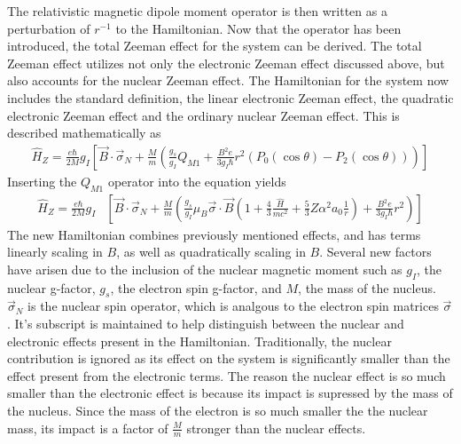            \noindent The relativistic magnetic dipole moment operator is then written as a perturbation of $r^{-1}$ to the Hamiltonian. Now that the operator has been introduced, the total Zeeman effect for the system can be derived. The total Zeeman effect utilizes not only the electronic Zeeman effect discussed above, but also accounts for the nuclear Zeeman effect. The Hamiltonian for the system now includes the standard definition, the linear electronic Zeeman effect, the quadratic electronic Zeeman effect and the ordinary nuclear Zeeman effect. This is described mathematically as 
            \begin{align}
                \hat{H}_Z = \frac{e\hbar}{2M} g_I  \left[ \vec{B} \cdot \vec{\sigma}_N + \frac{M}{m} \left(\frac{g_s}{g_I} Q_{M1} + \frac{B^2 e}{3g_I \hbar} r^2 \left( P_0(\cos \theta) - P_2(\cos\theta) \right) \right) \right]
            \end{align}
            \noindent Inserting the $Q_{M1}$ operator into the equation yields 
            \small         
            \begin{align}
                \hat{H}_Z = \frac{e\hbar}{2M} g_I  &\left[ \vec{B} \cdot \vec{\sigma}_N + \frac{M}{m} \left(\frac{g_s}{g_I} \mu_B \vec{\sigma} \cdot \vec{B} \left(1 + \frac{4}{3}\frac{\hat{H}}{mc^2} + \frac{5}{3} Z \alpha^2 a_0 \frac{1}{r} \right) + \frac{B^2 e}{3g_I \hbar} r^2 \right) \right]
            \end{align}
            \normalsize
            \noindent The new Hamiltonian combines previously mentioned effects, and has terms linearly scaling in $B$, as well as quadratically scaling in $B$. Several new factors have arisen due to the inclusion of the nuclear magnetic moment such as $g_I$, the nuclear g-factor, $g_s$, the electron spin g-factor, and $M$, the mass of the nucleus. $\vec{\sigma}_N$ is the nuclear spin operator, which is analgous to the electron spin matrices $\vec{\sigma}$. It's subscript is maintained to help distinguish between the nuclear and electronic effects present in the Hamiltonian. Traditionally, the nuclear contribution is ignored as its effect on the system is significantly smaller than the effect present from the electronic terms. The reason the nuclear effect is so much smaller than the electronic effect is because its impact is supressed by the mass of the nucleus. Since the mass of the electron is so much smaller the the nuclear mass, its impact is a factor of $\frac{M}{m}$ stronger than the nuclear effects.\\

